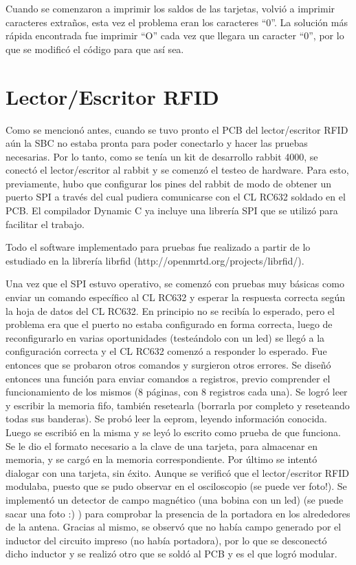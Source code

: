 Cuando se comenzaron a imprimir los saldos de las tarjetas, volvió a imprimir caracteres extraños, esta vez el problema eran los caracteres “0”. La solución más rápida encontrada fue imprimir “O” cada vez que llegara un caracter “0”, por lo que se modificó el código para que así sea.


\section{Lector/Escritor RFID}
Como se mencionó antes, cuando se tuvo pronto el PCB del lector/escritor RFID aún la SBC no estaba pronta para poder conectarlo y hacer las pruebas necesarias. Por lo tanto, como se tenía un kit de desarrollo rabbit 4000, se conectó el lector/escritor al rabbit y se comenzó el testeo de hardware. Para esto, previamente, hubo que configurar los pines del rabbit de modo de obtener un puerto SPI a través del cual pudiera comunicarse con el CL RC632 soldado en el PCB. El compilador Dynamic C ya incluye una librería SPI que se utilizó para facilitar el trabajo.

Todo el software implementado para pruebas fue realizado a partir de lo estudiado en la librería 
librfid (http://openmrtd.org/projects/librfid/).

Una vez que el SPI estuvo operativo, se comenzó con pruebas muy básicas como enviar un comando específico al CL RC632 y esperar la respuesta correcta según la hoja de datos del CL RC632. En principio no se recibía lo esperado, pero el problema era que el puerto no estaba configurado en forma correcta, luego de reconfigurarlo en varias oportunidades (testeándolo con un led) se llegó a la configuración correcta y el CL RC632 comenzó a responder lo esperado. Fue entonces que se probaron otros comandos y surgieron otros errores. Se diseñó entonces una función para enviar comandos a registros, previo comprender el funcionamiento de los mismos (8 páginas, con 8 registros cada una). 
Se logró leer y escribir la memoria fifo, también resetearla (borrarla por completo y reseteando todas sus banderas). Se probó leer la eeprom, leyendo información conocida. Luego se escribió en la misma y se leyó lo escrito como prueba de que funciona. 
Se le dio el formato necesario a la clave de una tarjeta, para almacenar en memoria, y se cargó en la memoria correspondiente. 
Por último se intentó dialogar con una tarjeta, sin éxito. Aunque se verificó que el lector/escritor RFID modulaba, puesto que se pudo observar en el osciloscopio (se puede ver foto!). 
Se implementó un detector de campo magnético (una bobina con un led) (se puede sacar una foto :) ) para comprobar la presencia de la portadora en los alrededores de la antena. Gracias al mismo, se observó que no había campo generado por el inductor del circuito impreso (no había portadora), por lo que se desconectó dicho inductor y se realizó otro que se soldó al PCB y es el que logró modular.

